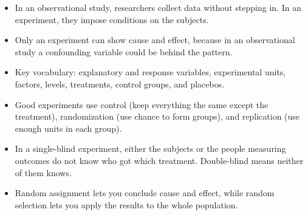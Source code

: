 \begin{mdframed}[style=important, frametitle={Key Ideas}]
\begin{itemize}
\item In an observational study, researchers collect data without stepping in. In an experiment, they impose conditions on the subjects.
\item Only an experiment can show cause and effect, because in an observational study a confounding variable could be behind the pattern.
\item Key vocabulary: explanatory and response variables, experimental units, factors, levels, treatments, control groups, and placebos.
\item Good experiments use control (keep everything the same except the treatment), randomization (use chance to form groups), and replication (use enough units in each group).
\item In a single-blind experiment, either the subjects or the people measuring outcomes do not know who got which treatment. Double-blind means neither of them knows.
\item Random assignment lets you conclude cause and effect, while random selection lets you apply the results to the whole population.
\end{itemize}
\end{mdframed}
